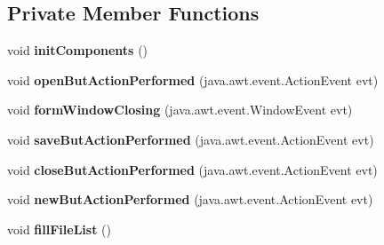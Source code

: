 \subsection*{Private Member Functions}
\begin{DoxyCompactItemize}
\item 
void {\bfseries init\+Components} ()\hypertarget{classsoftmakerjava_1_1_code_viewer_a0c3534d1084e242bded8585487b32dbe}{}\label{classsoftmakerjava_1_1_code_viewer_a0c3534d1084e242bded8585487b32dbe}

\item 
void {\bfseries open\+But\+Action\+Performed} (java.\+awt.\+event.\+Action\+Event evt)\hypertarget{classsoftmakerjava_1_1_code_viewer_af1db1c71f1044d85109f1e4b512c360e}{}\label{classsoftmakerjava_1_1_code_viewer_af1db1c71f1044d85109f1e4b512c360e}

\item 
void {\bfseries form\+Window\+Closing} (java.\+awt.\+event.\+Window\+Event evt)\hypertarget{classsoftmakerjava_1_1_code_viewer_a8ea1263bbcd0338d23b29ae4dd8e13b8}{}\label{classsoftmakerjava_1_1_code_viewer_a8ea1263bbcd0338d23b29ae4dd8e13b8}

\item 
void {\bfseries save\+But\+Action\+Performed} (java.\+awt.\+event.\+Action\+Event evt)\hypertarget{classsoftmakerjava_1_1_code_viewer_a29588c8139784f46ac2acf13d8a154b6}{}\label{classsoftmakerjava_1_1_code_viewer_a29588c8139784f46ac2acf13d8a154b6}

\item 
void {\bfseries close\+But\+Action\+Performed} (java.\+awt.\+event.\+Action\+Event evt)\hypertarget{classsoftmakerjava_1_1_code_viewer_aeb4ee33f12dac276f4b70a42ff1bdbbb}{}\label{classsoftmakerjava_1_1_code_viewer_aeb4ee33f12dac276f4b70a42ff1bdbbb}

\item 
void {\bfseries new\+But\+Action\+Performed} (java.\+awt.\+event.\+Action\+Event evt)\hypertarget{classsoftmakerjava_1_1_code_viewer_a7bf4517277800150189170f601230d40}{}\label{classsoftmakerjava_1_1_code_viewer_a7bf4517277800150189170f601230d40}

\item 
void {\bfseries fill\+File\+List} ()\hypertarget{classsoftmakerjava_1_1_code_viewer_acaa7808ba411eef554e9c353e6cb4bd3}{}\label{classsoftmakerjava_1_1_code_viewer_acaa7808ba411eef554e9c353e6cb4bd3}

\end{DoxyCompactItemize}
